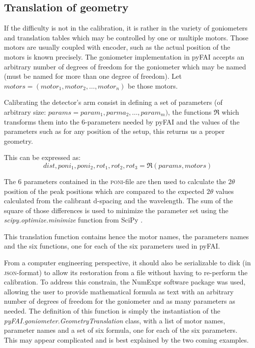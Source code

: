 \documentclass[preprint, pdf]{iucr}              %
\begin{document}
\subsection{Translation of geometry}

If the difficulty is not in the calibration, it is  rather in the variety of
goniometers and translation tables which may be controlled by one or multiple
motors.
Those motors are usually coupled with encoder, such as the actual position of
the motors is known precisely.
The goniometer implementation in pyFAI accepts an
arbitrary number of degrees of freedom for the goniometer which may be named 
(must be named for more than one degree of freedom). 
Let $motors = (motor_1, motor_2, \ldots, motor_n)$ be those motors. 

Calibrating the detector's arm consist in defining a set of parameters
(of arbitrary size: $params = param_1, parma_2, \ldots, param_m)$, the
functions $\Re$ which transforms them into the 6-parameters needed by pyFAI and 
the values of the parameters such as for any position of the setup, this returns
us a proper geometry.

This can be expressed as:
$$
dist, poni_1, poni_2, rot_1, rot_2, rot_3 = \Re(params, motors) $$

The 6 parameters contained in the \textsc{poni}-file  are then used to calculate
the $2\theta$ position of the peak positions which are compared to the expected $2\theta$
values calculated from the calibrant d-spacing and the wavelength. 
The sum of the square of those differences is used to minimize the parameter set
using the \textit{scipy.optimize.minimize} function from SciPy \cite{scipy}.

This translation function contains hence the motor names, the parameters names
and the six functions, one for each of the six parameters used in pyFAI. 

From a computer engineering perspective, it should also be serializable to 
disk (in \textsc{json}-format) to allow its restoration from a file without
having to re-perform the calibration. 
To address this constrain, the NumExpr software package \cite{numexpr} was
used, allowing the user to provide mathematical formula as text with an
arbitrary number of degrees of freedom for the goniometer and as many parameters
as needed.
The definition of this function is simply the instantiation of the
\textit{pyFAI.goniometer.GeometryTranslation} class, with a list of motor
names, parameter names and a set of six formula, one for each of the six parameters. 
This may appear complicated and is best explained by the two coming examples.
\end{document}
